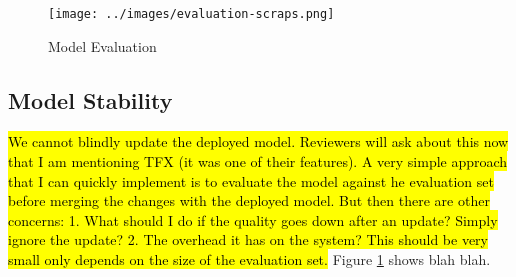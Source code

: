 \begin{figure}[t]
\centering
\texttt{[image: ../images/evaluation-scraps.png]}
\caption{Model Evaluation}
\label{fig:model-evaluation}
\end{figure}


\subsection{Model Stability}
\hl{We cannot blindly update the deployed model. Reviewers will ask about this now that I am mentioning TFX (it was one of their features).
A very simple approach that I can quickly implement is to evaluate the model against he evaluation set before merging the changes with the deployed model.
But then there are other concerns: 1. What should I do if the quality goes down after an update? Simply ignore the update? 2. The overhead it has on the system? This should be very small only depends on the size of the evaluation set.}
Figure \ref{fig:model-evaluation} shows blah blah.
